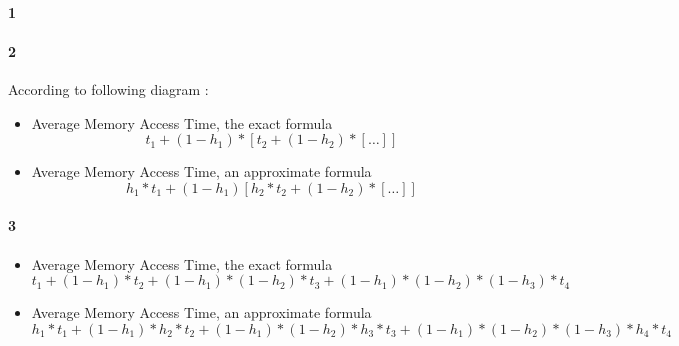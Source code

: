 \documentclass[11pt]{article}
\begin{document}
\paragraph{1}
\paragraph{2}
According to following diagram :


\begin{itemize}
\item
	Average Memory Access Time, the exact formula
	\begin{equation}
		\label{eq:AMAT-e}
		t_1 + (1 - h_1) * [t_2 + (1 - h_2) * [\ldots]]
	\end{equation}	
\item
	Average Memory Access Time, an approximate formula
	\begin{equation}
		\label{eq:AMAT-a}
		h_1 * t_1 + (1 - h_1) [h_2 * t_2 + (1 - h_2) * [\ldots]]
	\end{equation}
\end{itemize}
\paragraph{3}
\begin{itemize}
\item
	Average Memory Access Time, the exact formula
	\begin{equation}
		\label{eq:AMAT-e-4}
		t_1 + (1 - h_1) * t_2 + (1 - h_1) * (1 - h_2) * t_3 + (1 - h_1) * (1 - h_2) * (1 - h_3) * t_4
	\end{equation}
\item
	Average Memory Access Time, an approximate formula
	\begin{equation}
		\label{eq:AMAT-a-4}
		h_1 * t_1 + (1 - h_1) * h_2 * t_2 + (1 - h_1) * (1 - h_2) * h_3 * t_3 + (1 - h_1) * (1 - h_2) * (1 - h_3) * h_4 * t_4
	\end{equation}
\end{itemize}
\end{document}
